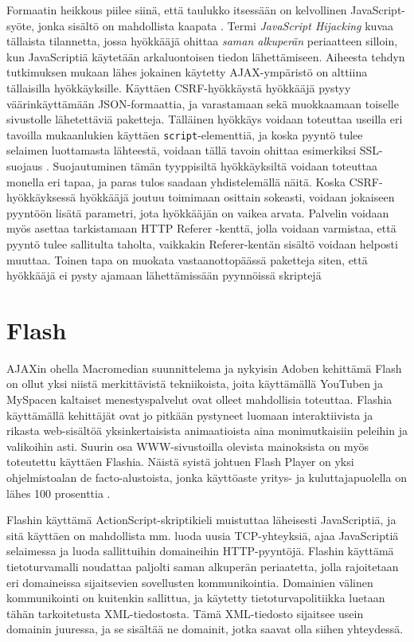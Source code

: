 Formaatin heikkous piilee siinä, että taulukko itsessään on
kelvollinen JavaScript-syöte, jonka sisältö on mahdollista kaapata
\cite{AJAX}. Termi \emph{JavaScript Hijacking} kuvaa tällaista
tilannetta, jossa hyökkääjä ohittaa \emph{saman alkuperän} periaatteen
silloin, kun JavaScriptiä käytetään arkaluontoisen tiedon
lähettämiseen. Aiheesta tehdyn tutkimuksen \cite{JSH} mukaan lähes
jokainen käytetty AJAX-ympäristö on alttiina tällaisilla
hyökkäyksille. Käyttäen CSRF-hyökkäystä hyökkääjä pystyy
väärinkäyttämään JSON-formaattia, ja varastamaan sekä muokkaamaan
toiselle sivustolle lähetettäviä paketteja.  Tälläinen hyökkäys
voidaan toteuttaa useilla eri tavoilla mukaanlukien käyttäen
\texttt{script}-elementtiä, ja koska pyyntö tulee selaimen luottamasta
lähteestä, voidaan tällä tavoin ohittaa esimerkiksi SSL-suojaus
\cite{AJAX}. Suojautuminen tämän tyyppisiltä hyökkäyksiltä voidaan
toteuttaa monella eri tapaa, ja paras tulos saadaan yhdistelemällä
näitä. Koska CSRF-hyökkäyksessä hyökkääjä joutuu toimimaan osittain
sokeasti, voidaan jokaiseen pyyntöön lisätä parametri, jota hyökkääjän
on vaikea arvata. Palvelin voidaan myös asettaa tarkistamaan HTTP
Referer -kenttä, jolla voidaan varmistaa, että pyyntö tulee sallitulta
taholta, vaikkakin Referer-kentän sisältö voidaan helposti
muuttaa. Toinen tapa on muokata vastaanottopäässä paketteja siten,
että hyökkääjä ei pysty ajamaan lähettämissään pyynnöissä skriptejä
\cite{JSH}

\section{Flash}

AJAXin ohella Macromedian suunnittelema ja nykyisin Adoben kehittämä
Flash on ollut yksi niistä merkittävistä tekniikoista, joita käyttämällä
YouTuben ja MySpacen kaltaiset menestyspalvelut ovat olleet
mahdollisia toteuttaa. Flashia käyttämällä kehittäjät ovat jo pitkään
pystyneet luomaan interaktiivista ja rikasta web-sisältöä
yksinkertaisista animaatioista aina monimutkaisiin peleihin ja
valikoihin asti. Suurin osa WWW-sivustoilla olevista mainoksista on
myös toteutettu käyttäen Flashia. Näistä syistä johtuen Flash Player
on yksi ohjelmistoalan de facto-alustoista, jonka käyttöaste yritys-
ja kuluttajapuolella on lähes 100 prosenttia \cite{Flash}.

Flashin käyttämä ActionScript-skriptikieli muistuttaa läheisesti
JavaScriptiä, ja sitä käyttäen on mahdollista mm. luoda uusia
TCP-yhteyksiä, ajaa JavaScriptiä selaimessa ja luoda sallittuihin
domaineihin HTTP-pyyntöjä. Flashin käyttämä tietoturvamalli noudattaa
paljolti saman alkuperän periaatetta, jolla rajoitetaan eri
domaineissa sijaitsevien sovellusten kommunikointia. Domainien välinen
kommunikointi on kuitenkin sallittua, ja käytetty tietoturvapolitiikka
luetaan tähän tarkoitetusta XML-tiedostosta. Tämä XML-tiedosto
sijaitsee usein domainin juuressa, ja se sisältää ne domainit, jotka
saavat olla siihen yhteydessä.

